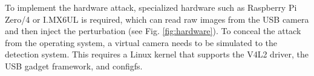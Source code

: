 To implement the hardware attack, specialized hardware such as Raspberry Pi Zero/4 or I.MX6UL is required, which can read raw images from the USB camera and then inject the perturbation (see Fig. \ref{fig:hardware}). To conceal the attack from the operating system, a virtual camera needs to be simulated to the detection system. This requires a Linux kernel that supports the V4L2 driver, the USB gadget framework, and configfs.







